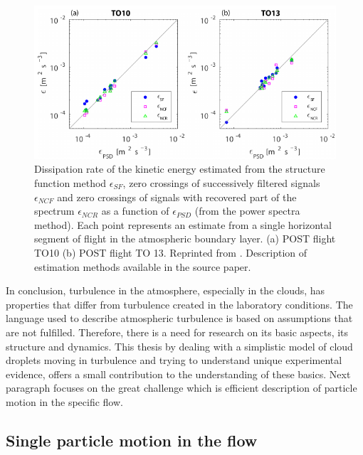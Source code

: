 \documentclass[../main.tex]{subfiles}
\begin{document}
\begin{figure}
\centering
\noindent \includegraphics[width=30pc]{gfx/epsilon_methods_POST.png}
\caption{Dissipation rate of the kinetic energy estimated from the structure function method $\epsilon_{SF}$, zero crossings of successively filtered signals $\epsilon_{NCF}$ and zero crossings of signals with recovered part of the spectrum $\epsilon_{NCR}$ as a function of $\epsilon_{PSD}$ (from the power spectra
method). Each point represents an estimate from a single horizontal segment of flight in the atmospheric boundary layer. (a) POST flight TO10 (b) POST flight TO 13. Reprinted from \citet{Waclawczyk2017}. Description of estimation methods available in the source paper.}
\label{fig:ch1_04}
\end{figure}
In conclusion, turbulence in the atmosphere, especially in the clouds, has properties that differ from turbulence created in the laboratory conditions. The language used to describe atmospheric turbulence is based on assumptions that are not fulfilled. Therefore, there is a need for research on its basic aspects, its structure and dynamics. This thesis by dealing with a simplistic model of cloud droplets moving in turbulence and trying to understand unique experimental evidence, offers a small contribution to the understanding of these basics. Next paragraph focuses on the great challenge which is efficient description of particle motion in the specific flow.


\subsection{Single particle motion in the flow}
\end{document}
